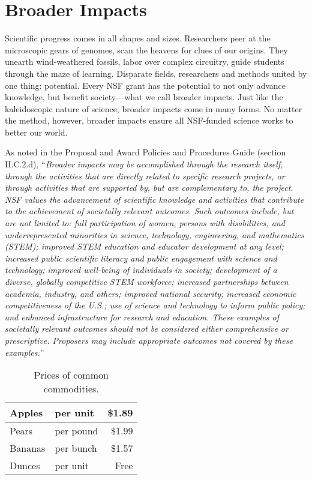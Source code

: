 \documentclass[11pt]{article} %
\begin{document}
%
%

\section{Broader Impacts\label{sec:BI}}

Scientific progress comes in all shapes and sizes. Researchers peer at the microscopic gears of genomes, scan the heavens for clues of our origins. They unearth wind-weathered fossils, labor over complex circuitry, guide students through the maze of learning. Disparate fields, researchers and methods united by one thing: potential. Every NSF grant has the potential to not only advance knowledge, but benefit society---what we call broader impacts. Just like the kaleidoscopic nature of science, broader impacts come in many forms. No matter the method, however, broader impacts ensure all NSF-funded science works to better our world.

As noted in the Proposal and Award Policies and Procedures Guide (section II.C.2.d), ``\textit{Broader impacts may be accomplished through the research itself, through the activities that are directly related to specific research projects, or through activities that are supported by, but are complementary to, the project. NSF values the advancement of scientific knowledge and activities that contribute to the achievement of societally relevant outcomes. Such outcomes include, but are not limited to: full participation of women, persons with disabilities, and underrepresented minorities in science, technology, engineering, and mathematics (STEM); improved STEM education and educator development at any level; increased public scientific literacy and public engagement with science and technology; improved well-being of individuals in society; development of a diverse, globally competitive STEM workforce; increased partnerships between academia, industry, and others; improved national security; increased economic competitiveness of the U.S.; use of science and technology to inform public policy; and enhanced infrastructure for research and education. These examples of societally relevant outcomes should not be considered either comprehensive or prescriptive. Proposers may include appropriate outcomes not covered by these examples.}''

\begin{table}
 \begin{center}
  \begin{tabular}{|l|l|r|}
  \hline
   Apples & per unit & \$1.89 \\
  \hline
   Pears & per pound & \$1.99 \\
  \hline
   Bananas & per bunch & \$1.57 \\
  \hline
   Dunces & per unit & Free \\
   \hline
  \end{tabular}
 \end{center}
 \caption{Prices of common commodities.}
 \label{table-prices}
\end{table}
\end{document}
